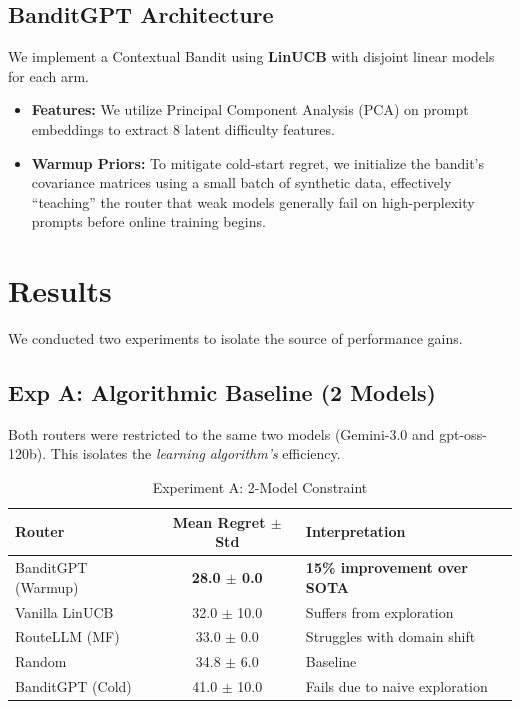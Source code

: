 \documentclass[sigconf]{acmart}
\begin{document}
\subsection{BanditGPT Architecture}
We implement a Contextual Bandit using \textbf{LinUCB} with disjoint linear models for each arm.
\begin{itemize}
    \item \textbf{Features:} We utilize Principal Component Analysis (PCA) on prompt embeddings to extract 8 latent difficulty features.
    \item \textbf{Warmup Priors:} To mitigate cold-start regret, we initialize the bandit's covariance matrices using a small batch of synthetic data, effectively ``teaching'' the router that weak models generally fail on high-perplexity prompts before online training begins.
\end{itemize}

\section{Results}

We conducted two experiments to isolate the source of performance gains.

\subsection{Exp A: Algorithmic Baseline (2 Models)}
Both routers were restricted to the same two models (Gemini-3.0 and gpt-oss-120b). This isolates the \textit{learning algorithm's} efficiency.

\begin{table}[h]
\centering
\caption{Experiment A: 2-Model Constraint}
\label{tab:exp-a}
\begin{tabular}{l c l}
\toprule
\textbf{Router} & \textbf{Mean Regret $\pm$ Std} & \textbf{Interpretation} \\
\midrule
BanditGPT (Warmup) & \textbf{28.0 $\pm$ 0.0} & \textbf{15\% improvement over SOTA} \\
Vanilla LinUCB & 32.0 $\pm$ 10.0 & Suffers from exploration \\
RouteLLM (MF) & 33.0 $\pm$ 0.0 & Struggles with domain shift \\
Random & 34.8 $\pm$ 6.0 & Baseline \\
BanditGPT (Cold) & 41.0 $\pm$ 10.0 & Fails due to naive exploration \\
\bottomrule
\end{tabular}
\end{table}
\end{document}
